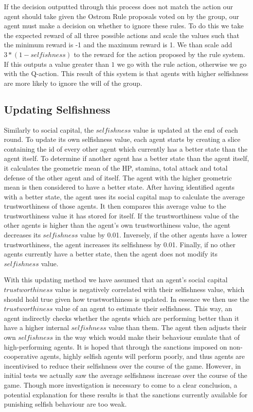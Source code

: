 If the decision outputted through this process does not match the action our agent should take given the Ostrom Rule proposals voted on by the group, our agent must make a decision on whether to ignore these rules. To do this we take the expected reward of all three possible actions and scale the values such that the minimum reward is -1 and the maximum reward is 1. We than scale add $3*(1-selfishness)$ to the reward for the action proposed by the rule system. If this outputs a value greater than $1$ we go with the rule action, otherwise we go with the Q-action. This result of this system is that agents with higher selfishness are more likely to ignore the will of the group. 

\subsection{Updating Selfishness}

Similarly to social capital, the $selfishness$ value is updated at the end of each round. To update its own selfishness value, each agent starts by creating a slice containing the id of every other agent which currently has a better state than the agent itself. To determine if another agent has a better state than the agent itself, it calculates the geometric mean of the HP, stamina, total attack and total defense of the other agent and of itself. The agent with the higher geometric mean is then considered to have a better state. After having identified agents with a better state, the agent uses its social capital map to calculate the average trustworthiness of those agents. It then compares this average value to the trustworthiness value it has stored for itself. If the trustworthiness value of the other agents is higher than the agent's own trustworthiness value, the agent decreases its $selfishness$ value by 0.01. Inversely, if the other agents have a lower trustworthiness, the agent increases its selfishness by 0.01. Finally, if no other agents currently have a better state, then the agent does not modify its $selfishness$ value.

With this updating method we have assumed that an agent's social capital $trustworthiness$ value is negatively correlated with their selfishness value, which should hold true given how trustworthiness is updated. In essence we then use the $trustworthiness$ value of an agent to estimate their selfishness. This way, an agent indirectly checks whether the agents which are performing better than it have a higher internal $selfishness$ value than them. The agent then adjusts their own $selfishness$ in the way which would make their behaviour emulate that of high-performing agents. It is hoped that through the sanctions imposed on non-cooperative agents, highly selfish agents will perform poorly, and thus agents are incentivised to reduce their selfishness over the course of the game. However, in initial tests we actually saw the average selfishness increase over the course of the game. Though more investigation is necessary to come to a clear conclusion, a potential explanation for these results is that the sanctions currently available for punishing selfish behaviour are too weak. 

